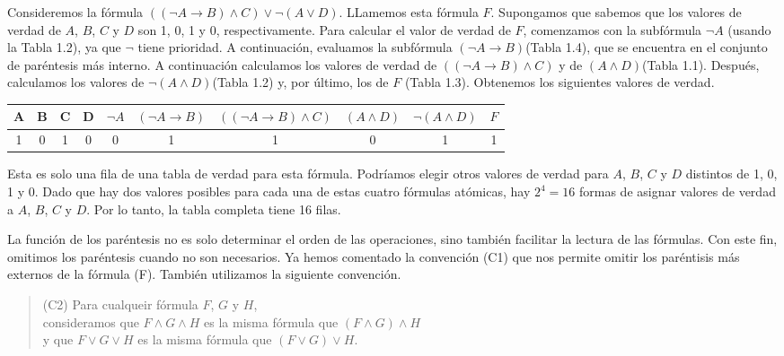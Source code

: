 \documentclass[12pt,a4paper]{book}
\begin{document}
    \begin{ejemplo}
        Consideremos la fórmula $((\neg A\rightarrow B)\wedge C)\vee\neg(A\vee D)$. LLamemos esta fórmula $F$. Supongamos que sabemos que los valores de verdad de
        $A$, $B$, $C$ y $D$ son 1, 0, 1 y 0, respectivamente. Para calcular el valor de verdad de $F$, comenzamos con la subfórmula $\neg A$ (usando la Tabla 1.2),
        ya que $\neg$ tiene prioridad. A continuación, evaluamos la subfórmula $(\neg A\rightarrow B)$(Tabla 1.4), que se encuentra en el conjunto de paréntesis
        más interno. A continuación calculamos los valores de verdad de $((\neg A\rightarrow B)\wedge C)$ y de $(A\wedge D)$(Tabla 1.1). Después, calculamos los
        valores de $\neg(A\wedge D)$(Tabla 1.2) y, por último, los de $F$ (Tabla 1.3). Obtenemos los siguientes valores de verdad.

        \begin{table}[htbp]
            \renewcommand{\arraystretch}{1.5}
            \setlength{\tabcolsep}{10pt}
            \begin{tabular}{c |c |c |c |c |c |c |c |c |c}
                A & B & C & D & $\neg A$ & $(\neg A\rightarrow B)$ & $((\neg A\rightarrow B)\wedge C)$ & $(A\wedge D)$ & $\neg (A\wedge D)$ & $F$\\
                \hline
                1 & 0 & 1 & 0 & 0 & 1 & 1 & 0 & 1 & 1
            \end{tabular}
        \end{table}

        Esta es solo una fila de una tabla de verdad para esta fórmula. Podríamos elegir otros valores de verdad para $A$, $B$, $C$ y $D$ distintos de
        1, 0, 1 y 0. Dado que hay dos valores posibles para cada una de estas cuatro fórmulas atómicas, hay $2^{4}=16$ formas de asignar valores de verdad
        a $A$, $B$, $C$ y $D$. Por lo tanto, la tabla completa tiene 16 filas.
    \end{ejemplo}

    La función de los paréntesis no es solo determinar el orden de las operaciones, sino también facilitar la lectura de las fórmulas. Con este fin, omitimos los paréntesis
    cuando no son necesarios. Ya hemos comentado la convención (C1) que nos permite omitir los paréntisis más externos de la fórmula (F). También utilizamos
    la siguiente convención.

    \begin{quote}
        (C2) Para cualqueir fórmula $F$, $G$ y $H$,\\
        consideramos que $F\wedge G\wedge H$ es la misma fórmula que $(F\wedge G)\wedge H$\\
        y que $F\vee G\vee H$ es la misma fórmula que $(F\vee G)\vee H$.
    \end{quote}
\end{document}
